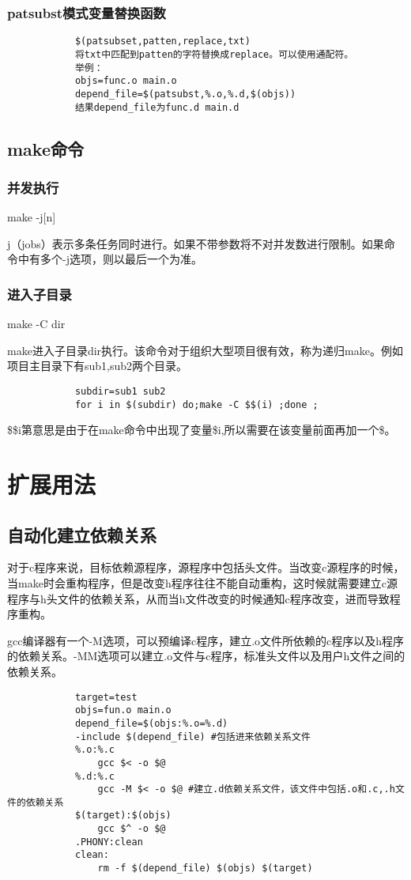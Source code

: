\documentclass{article}
\begin{document}
\begin{CJK}{UTF8}{gbsn}
		\subsubsection{patsubst模式变量替换函数}
		\begin{verbatim}
			$(patsubset,patten,replace,txt)
			将txt中匹配到patten的字符替换成replace。可以使用通配符。
			举例：
			objs=func.o main.o
			depend_file=$(patsubst,%.o,%.d,$(objs))
			结果depend_file为func.d main.d
		\end{verbatim}

	\subsection{make命令}
	\subsubsection{并发执行}
		make -j[n]\par
		j（jobs）表示多条任务同时进行。如果不带参数将不对并发数进行限制。如果命令中有多个-j选项，则以最后一个为准。
	\subsubsection{进入子目录}
		make -C  dir\par
		make进入子目录dir执行。该命令对于组织大型项目很有效，称为递归make。例如项目主目录下有sub1,sub2两个目录。\par
		\begin{verbatim}
			subdir=sub1 sub2
			for i in $(subdir) do;make -C $$(i) ;done ;
		\end{verbatim}\par
		\$\$i第意思是由于在make命令中出现了变量\$i,所以需要在该变量前面再加一个\$。	
	\section{扩展用法}
	\subsection{自动化建立依赖关系}
		对于c程序来说，目标依赖源程序，源程序中包括头文件。当改变c源程序的时候，当make时会重构程序，但是改变h程序往往不能自动重构，这时候就需要建立c源程序与h头文件的依赖关系，从而当h文件改变的时候通知c程序改变，进而导致程序重构。
		\par
		gcc编译器有一个-M选项，可以预编译c程序，建立.o文件所依赖的c程序以及h程序的依赖关系。-MM选项可以建立.o文件与c程序，标准头文件以及用户h文件之间的依赖关系。
		\begin{verbatim}
			target=test
			objs=fun.o main.o
			depend_file=$(objs:%.o=%.d)
			-include $(depend_file) #包括进来依赖关系文件
			%.o:%.c
			    gcc $< -o $@
			%.d:%.c
			    gcc -M $< -o $@ #建立.d依赖关系文件，该文件中包括.o和.c,.h文件的依赖关系
			$(target):$(objs)
			    gcc $^ -o $@
			.PHONY:clean
			clean:
			    rm -f $(depend_file) $(objs) $(target)
		\end{verbatim}


\end{CJK}
\end{document}
